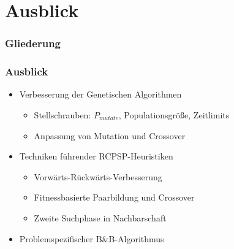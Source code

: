 \section{Ausblick}

\begin{frame}[noframenumbering]
\frametitle{Gliederung}
\end{frame}

\begin{frame}
\frametitle{Ausblick}
\begin{itemize}
\item Verbesserung der Genetischen Algorithmen
	\begin{itemize}
	\item Stellschrauben: $P_{mutate}$, Populationsgröße, Zeitlimits
	\item Anpassung von Mutation und Crossover\\[6mm]
	\end{itemize}
\item Techniken führender RCPSP-Heuristiken
	\begin{itemize}
	\item Vorwärts-Rückwärts-Verbesserung
	\item Fitnessbasierte Paarbildung und Crossover
	\item Zweite Suchphase in Nachbarschaft\\[6mm]
	\end{itemize}
\item Problemspezifischer B\&B-Algorithmus
\end{itemize}
\end{frame}




